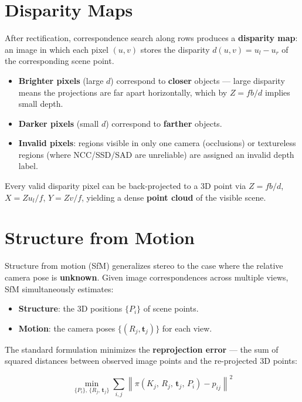 \documentclass[11pt,a4paper]{article}
\theoremstyle{definition}
\theoremstyle{plain}
\theoremstyle{remark}
\newcommand{\p}[1]{\mathbf{#1}}             %
\newcommand{\norm}[1]{\left\lVert#1\right\rVert}
\begin{document}
\section{Disparity Maps}

After rectification, correspondence search along rows produces a \textbf{disparity map}: an image in which each pixel $(u, v)$ stores the disparity $d(u,v) = u_l - u_r$ of the corresponding scene point.

\begin{itemize}
    \item \textbf{Brighter pixels} (large $d$) correspond to \textbf{closer} objects — large disparity means the projections are far apart horizontally, which by $Z = fb/d$ implies small depth.
    \item \textbf{Darker pixels} (small $d$) correspond to \textbf{farther} objects.
    \item \textbf{Invalid pixels}: regions visible in only one camera (occlusions) or textureless regions (where NCC/SSD/SAD are unreliable) are assigned an invalid depth label.
\end{itemize}

Every valid disparity pixel can be back-projected to a 3D point via $Z = fb/d$, $X = Zu_l/f$, $Y = Zv/f$, yielding a dense \textbf{point cloud} of the visible scene.

\section{Structure from Motion}

Structure from motion (SfM) generalizes stereo to the case where the relative camera pose is \textbf{unknown}. Given image correspondences across multiple views, SfM simultaneously estimates:

\begin{itemize}
    \item \textbf{Structure}: the 3D positions $\{P_i\}$ of scene points.
    \item \textbf{Motion}: the camera poses $\{(R_j, \p{t}_j)\}$ for each view.
\end{itemize}

The standard formulation minimizes the \textbf{reprojection error} — the sum of squared distances between observed image points and the re-projected 3D points:

\[
\min_{\{P_i\},\,\{R_j,\,\p{t}_j\}} \sum_{i,j} \norm{\pi(K_j,\, R_j,\, \p{t}_j,\, P_i) - p_{ij}}^2
\]
\end{document}
